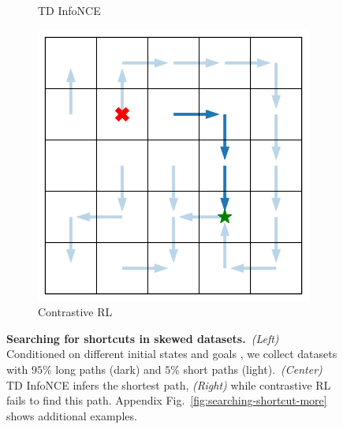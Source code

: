 \documentclass{article} %
\newcommand{\heavyxmark}{\ding{54}}%
\newcommand{\starmark}{\ding{72}}%
\begin{document}
\begin{figure}[t]
\begin{minipage}{0.48\textwidth}
\begin{subfigure}[c]{0.32\linewidth}
                \caption*{TD InfoNCE}
            \end{subfigure}
            \hfill
            \begin{subfigure}[c]{0.32\linewidth}
                \includegraphics[width=\linewidth]{figures/policy_analysis/shortcut_searching_single_contrastive_rl.pdf}
                \caption*{Contrastive RL}
            \end{subfigure}
            \caption{\footnotesize \textbf{Searching for shortcuts in skewed datasets.}~\emph{(Left)} Conditioned on different initial states \textcolor{Red}{\heavyxmark} and goals \textcolor{OliveGreen}{\starmark}, we collect datasets with $95\%$ long paths (dark) and $5\%$ short paths (light).~\emph{(Center)} TD InfoNCE infers the shortest path, \emph{(Right)} while contrastive RL fails to find this path. Appendix Fig.~\ref{fig:searching-shortcut-more} shows additional examples.}
            \label{fig:searching-shotcut}
    \end{minipage}
\end{figure}
\end{document}

